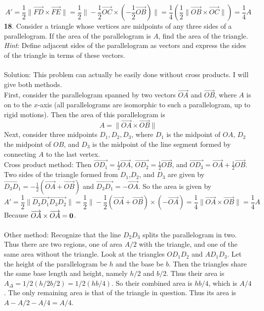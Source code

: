 \documentclass[12pt]{amsbook}
\begin{document}
$$A'=\frac 12\|\overrightarrow{FD}\times\overrightarrow{FE}\|=\frac 12\|-\frac 12\overrightarrow{OC}\times(-\frac 12\overrightarrow{OB})\|=\frac 14 (\frac 12\|\overrightarrow{OB}\times\overrightarrow{OC}\|)=\frac 14A$$
{\small\bf 18}. Consider a triangle whose vertices are midpoints
of any three sides of a parallelogram. If the area of 
the parallelogram is $A$, find the area of the triangle. {\it Hint}:
Define adjacent sides of the parallelogram as vectors and express the 
sides of the triangle in terms of these vectors.\\
\\
{\sc Solution}:
This problem can actually be easily done without cross products. I will give both methods.
\\
First, consider the parallelogram spanned by two vectors $\overrightarrow{OA}$ and $\overrightarrow{OB}$, where $A$ is on to the $x$-axis (all parallelograms are isomorphic to such a parallelogram, up to rigid motions). Then the area of this parallelogram is
$$A=\|\overrightarrow{OA}\times\overrightarrow{OB}\|$$
Next, consider three midpoints $D_1,D_2,D_3$, where $D_1$ is the midpoint of $OA$, $D_2$ the midpoint of $OB$, and $D_3$ is the midpoint of the line segment formed by connecting $A$ to the last vertex. 
\\
Cross product method: Then $\overrightarrow{OD_1}=\frac 12\overrightarrow{OA}$, $\overrightarrow{OD_2}=\frac 12\overrightarrow{OB}$, and $\overrightarrow{OD_3}=\overrightarrow{OA}+\frac 12\overrightarrow{OB}$. Two sides of the triangle formed from $D_1$,$D_2$, and $D_3$ are given by $\overrightarrow{D_3D_1}=-\frac 12(\overrightarrow{OA}+\overrightarrow{OB})$ and $\overrightarrow{D_3D_1}=-\overrightarrow{OA}$. So the area is given by
$$A'=\frac 12\|\overrightarrow{D_3D_1}\overrightarrow{D_3D_2}\|=\frac 12\|-\frac 12(\overrightarrow{OA}+\overrightarrow{OB})\times(-\overrightarrow{OA})=\frac 14\|\overrightarrow{OA}\times\overrightarrow{OB}\|=\frac 14A$$
Because $\overrightarrow{OA}\times\overrightarrow{OA}={\bf 0}$.
\\
\\
Other method: Recognize that the line $D_2D_3$ splits the parallelogram in two. Thus there are two regions, one of area $A/2$ with the triangle, and one of the same area without the triangle. Look at the triangles $OD_1D_2$ and $AD_1D_3$. Let the height of the parallelogram be $h$ and the base be $b$. Then the triangles share the same base length and height, namely $h/2$ and $b/2$. Thus their area is $A_\Delta=1/2(h/2b/2)=1/2(hb/4)$. So their combined area is $hb/4$, which is $A/4$. The only remaining area is that of the triangle in question. Thus its area is $A-A/2-A/4=A/4$.
\end{document}
